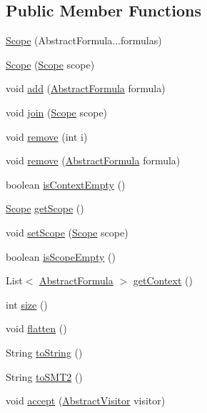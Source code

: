 \subsection*{Public Member Functions}
\begin{DoxyCompactItemize}
\item 
\hyperlink{classuran_1_1formula_1_1_scope_ac5661afaf89ebf683a789f58c5f91eb3}{Scope} (Abstract\+Formula...\+formulas)
\item 
\hyperlink{classuran_1_1formula_1_1_scope_aeda91ed3809961683dd236647e2d9871}{Scope} (\hyperlink{classuran_1_1formula_1_1_scope}{Scope} scope)
\item 
void \hyperlink{classuran_1_1formula_1_1_scope_a069703af6e4b8265d4c99447f3a46403}{add} (\hyperlink{classuran_1_1formula_1_1_abstract_formula}{Abstract\+Formula} formula)
\item 
void \hyperlink{classuran_1_1formula_1_1_scope_a535ee6b2618a9221c1c305ab2ef0529b}{join} (\hyperlink{classuran_1_1formula_1_1_scope}{Scope} scope)
\item 
void \hyperlink{classuran_1_1formula_1_1_scope_a6a0a1111b24099bfc0213b093aa2181a}{remove} (int i)
\item 
void \hyperlink{classuran_1_1formula_1_1_scope_a8cb26db7fe4cc5f5e29a2ad3cbb3ee75}{remove} (\hyperlink{classuran_1_1formula_1_1_abstract_formula}{Abstract\+Formula} formula)
\item 
boolean \hyperlink{classuran_1_1formula_1_1_scope_a0e0e85a0dc10fa8aee50432dbd32c972}{is\+Context\+Empty} ()
\item 
\hyperlink{classuran_1_1formula_1_1_scope}{Scope} \hyperlink{classuran_1_1formula_1_1_scope_a93562fc2826ae2bda02db75223718abc}{get\+Scope} ()
\item 
void \hyperlink{classuran_1_1formula_1_1_scope_a200033f86dfddcc1f11b6f048ad78c5f}{set\+Scope} (\hyperlink{classuran_1_1formula_1_1_scope}{Scope} scope)
\item 
boolean \hyperlink{classuran_1_1formula_1_1_scope_aa87c683a73376736ee94c258540e1d7d}{is\+Scope\+Empty} ()
\item 
List$<$ \hyperlink{classuran_1_1formula_1_1_abstract_formula}{Abstract\+Formula} $>$ \hyperlink{classuran_1_1formula_1_1_scope_a3fb012481e2d448c685fdb7569b881f3}{get\+Context} ()
\item 
int \hyperlink{classuran_1_1formula_1_1_scope_aafc3a7f249e92343c3343b52ace8a4d7}{size} ()
\item 
void \hyperlink{classuran_1_1formula_1_1_scope_a137ea46a83effb6bd9f432bdda2c49e0}{flatten} ()
\item 
String \hyperlink{classuran_1_1formula_1_1_scope_a0c93ff24b68cd689c7e7d9472fefcfa6}{to\+String} ()
\item 
String \hyperlink{classuran_1_1formula_1_1_scope_a425aaeb37f0d4f8133a25662a5b6fd1c}{to\+S\+M\+T2} ()
\item 
void \hyperlink{classuran_1_1formula_1_1_scope_ab0374b55637b597b49bf58e7cf581f1b}{accept} (\hyperlink{classuran_1_1formula_1_1visitor_1_1_abstract_visitor}{Abstract\+Visitor} visitor)
\end{DoxyCompactItemize}


